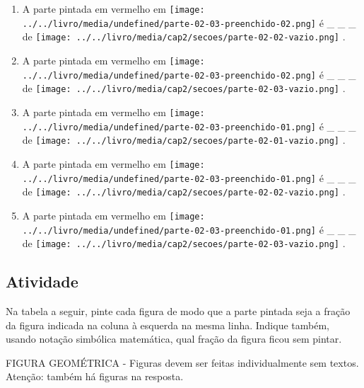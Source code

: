 \documentclass[a4,12pt]{book}
\begin{document}
\begin{enumerate} [\quad a)]
  \item     A parte pintada em vermelho em         \texttt{[image: ../../livro/media/undefined/parte-02-03-preenchido-02.png]}     é \_ \_ \_   de         \texttt{[image: ../../livro/media/cap2/secoes/parte-02-02-vazio.png]}    .
  \item     A parte pintada em vermelho em         \texttt{[image: ../../livro/media/undefined/parte-02-03-preenchido-02.png]}     é \_ \_ \_   de         \texttt{[image: ../../livro/media/cap2/secoes/parte-02-03-vazio.png]}    .
  \item     A parte pintada em vermelho em         \texttt{[image: ../../livro/media/undefined/parte-02-03-preenchido-01.png]}     é \_ \_ \_   de         \texttt{[image: ../../livro/media/cap2/secoes/parte-02-01-vazio.png]}    .
  \item     A parte pintada em vermelho em         \texttt{[image: ../../livro/media/undefined/parte-02-03-preenchido-01.png]}     é \_ \_ \_   de         \texttt{[image: ../../livro/media/cap2/secoes/parte-02-02-vazio.png]}    .
  \item     A parte pintada em vermelho em         \texttt{[image: ../../livro/media/undefined/parte-02-03-preenchido-01.png]}     é \_ \_ \_   de         \texttt{[image: ../../livro/media/cap2/secoes/parte-02-03-vazio.png]}    .
\end{enumerate} %








\subsection{Atividade}







Na tabela a seguir, pinte cada figura de modo que a parte pintada seja a fração da figura indicada na coluna à esquerda na mesma linha. Indique também, usando notação simbólica matemática, qual fração da figura ficou sem pintar.
\begin{imagem*}[breakable]{}{}   FIGURA GEOMÉTRICA - Figuras devem ser feitas individualmente sem textos. Atenção: também há figuras na resposta. \end{imagem*}
\end{document}
